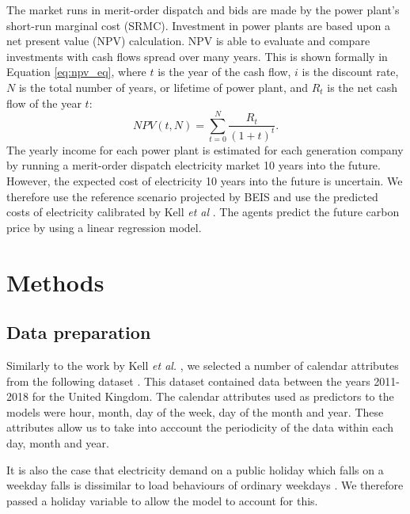 \documentclass[final,3p,times,twocolumn,numbers]{elsarticle}
\begin{document}
The market runs in merit-order dispatch and bids are made by the power plant's short-run marginal cost (SRMC). Investment in power plants are based upon a net present value (NPV) calculation. NPV is able to evaluate and compare investments with cash flows spread over many years. This is shown formally in Equation \ref{eq:npv_eq}, where $t$ is the year of the cash flow, $i$ is the discount rate, $N$ is the total number of years, or lifetime of power plant, and $R_t$ is the net cash flow of the year $t$:
\begin{equation} \label{eq:npv_eq}
NPV(t, N) = \sum_{t=0}^{N}\frac{R_t}{(1+t)^t}.
\end{equation}
The yearly income for each power plant is estimated for each generation company by running a merit-order dispatch electricity market 10 years into the future. However, the expected cost of electricity 10 years into the future is uncertain. We therefore use the reference scenario projected by BEIS and use the predicted costs of electricity calibrated by Kell \textit{et al} \cite{DBEIS2019, Kell2020}. The agents predict the future carbon price by using a linear regression model.


 
\section{Methods}
\label{sec:methods}


\subsection{Data preparation}

Similarly to the work by Kell \textit{et al.} \cite{Kell2018a}, we selected a number of calendar attributes from the following dataset \cite{gbnationalgridstatus_2019}. This dataset contained data between the years 2011-2018 for the United Kingdom. The calendar attributes used as predictors to the models were hour, month, day of the week, day of the month and year. These attributes allow us to take into acccount the periodicity of the data within each day, month and year.

It is also the case that electricity demand on a public holiday which falls on a weekday falls is dissimilar to load behaviours of ordinary weekdays \cite{Kim2000}. We therefore passed a holiday variable to allow the model to account for this.
\end{document}
